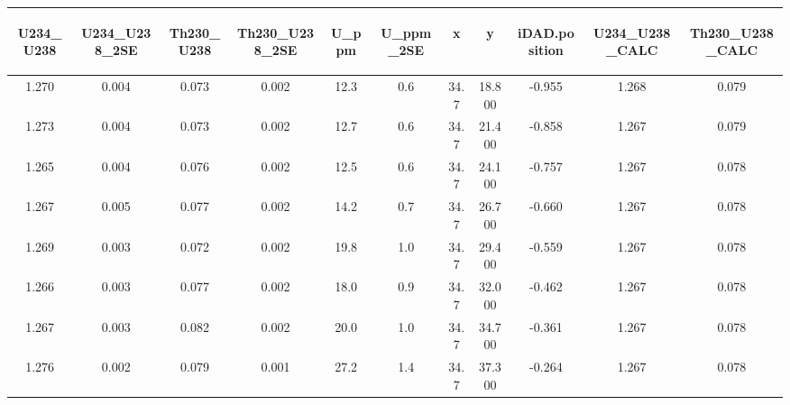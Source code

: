 \documentclass[]{elsarticle} %
\begin{document}
\begin{table}[ht]
\centering
\begin{tabular}{ccccccccccc}
  \hline
\begin{sideways} U234\_U238 \end{sideways} & \begin{sideways} U234\_U238\_2SE \end{sideways} & \begin{sideways} Th230\_U238 \end{sideways} & \begin{sideways} Th230\_U238\_2SE \end{sideways} & \begin{sideways} U\_ppm \end{sideways} & \begin{sideways} U\_ppm\_2SE \end{sideways} & \begin{sideways} x \end{sideways} & \begin{sideways} y \end{sideways} & \begin{sideways} iDAD.position \end{sideways} & \begin{sideways} U234\_U238\_CALC \end{sideways} & \begin{sideways} Th230\_U238\_CALC \end{sideways} \\ 
  \hline
1.270 & 0.004 & 0.073 & 0.002 & 12.3 & 0.6 & 34.7 & 18.800 & -0.955 & 1.268 & 0.079 \\ 
  1.273 & 0.004 & 0.073 & 0.002 & 12.7 & 0.6 & 34.7 & 21.400 & -0.858 & 1.267 & 0.079 \\ 
  1.265 & 0.004 & 0.076 & 0.002 & 12.5 & 0.6 & 34.7 & 24.100 & -0.757 & 1.267 & 0.078 \\ 
  1.267 & 0.005 & 0.077 & 0.002 & 14.2 & 0.7 & 34.7 & 26.700 & -0.660 & 1.267 & 0.078 \\ 
  1.269 & 0.003 & 0.072 & 0.002 & 19.8 & 1.0 & 34.7 & 29.400 & -0.559 & 1.267 & 0.078 \\ 
  1.266 & 0.003 & 0.077 & 0.002 & 18.0 & 0.9 & 34.7 & 32.000 & -0.462 & 1.267 & 0.078 \\ 
  1.267 & 0.003 & 0.082 & 0.002 & 20.0 & 1.0 & 34.7 & 34.700 & -0.361 & 1.267 & 0.078 \\ 
  1.276 & 0.002 & 0.079 & 0.001 & 27.2 & 1.4 & 34.7 & 37.300 & -0.264 & 1.267 & 0.078 \\ 

\end{tabular}
\end{table}
\end{document}
